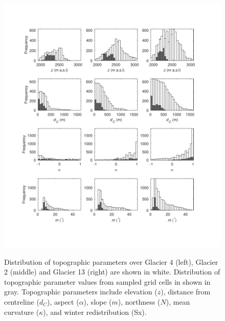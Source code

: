 \documentclass[review,oneside, letterpaper]{igs}
\begin{document}
\begin{figure}
	\centering
	\includegraphics[width =\textwidth]{TopoParamsSampled1.pdf}\\
	\caption{Distribution of topographic parameters over Glacier 4 (left), Glacier 2 (middle) and Glacier 13 (right) are shown in white. Distribution of topographic parameter values from sampled grid cells in shown in gray. Topographic parameters include elevation ($z$), distance from centreline ($d_C$), aspect ($\alpha$), slope ($m$), northness ($N$), mean curvature ($\kappa$), and winter redistribution (Sx).}
	\label{fig:TopoParamsSampled1}
\end{figure}
\end{document}
